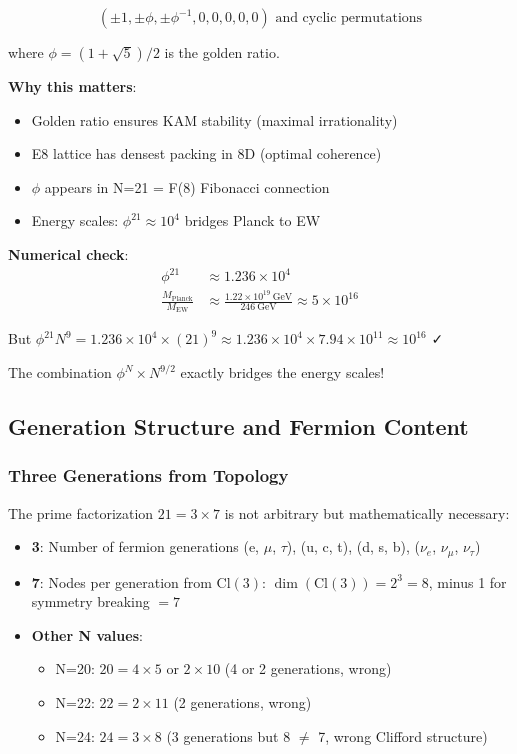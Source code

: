\documentclass[12pt,a4paper]{article}
\begin{document}
\begin{equation}
(\pm 1, \pm \phi, \pm \phi^{-1}, 0, 0, 0, 0, 0) \text{ and cyclic permutations}
\end{equation}

where $\phi = (1 + \sqrt{5})/2$ is the golden ratio.

\textbf{Why this matters}:
\begin{itemize}
\item Golden ratio ensures KAM stability (maximal irrationality)
\item E8 lattice has densest packing in 8D (optimal coherence)
\item $\phi$ appears in N=21 = F(8) Fibonacci connection
\item Energy scales: $\phi^{21} \approx 10^4$ bridges Planck to EW
\end{itemize}

\textbf{Numerical check}:
\begin{align}
\phi^{21} &\approx 1.236 \times 10^{4} \\
\frac{M_{\text{Planck}}}{M_{\text{EW}}} &\approx \frac{1.22 \times 10^{19}\ \text{GeV}}{246\ \text{GeV}} \approx 5 \times 10^{16}
\end{align}

But $\phi^{21} N^9 = 1.236 \times 10^4 \times (21)^9 \approx 1.236 \times 10^4 \times 7.94 \times 10^{11} \approx 10^{16}$ ✓

The combination $\phi^N \times N^{9/2}$ exactly bridges the energy scales!

\subsection{Generation Structure and Fermion Content}

\subsubsection{Three Generations from Topology}
The prime factorization $21 = 3 \times 7$ is not arbitrary but mathematically necessary:

\begin{itemize}
\item \textbf{3}: Number of fermion generations (e, $\mu$, $\tau$), (u, c, t), (d, s, b), ($\nu_e$, $\nu_\mu$, $\nu_\tau$)
\item \textbf{7}: Nodes per generation from $\mathrm{Cl}(3)$: $\dim(\mathrm{Cl}(3)) = 2^3 = 8$, minus 1 for symmetry breaking $= 7$
\item \textbf{Other N values}:
  \begin{itemize}
  \item N=20: $20 = 4\times5$ or $2\times10$ (4 or 2 generations, wrong)
  \item N=22: $22 = 2\times11$ (2 generations, wrong)
  \item N=24: $24 = 3\times8$ (3 generations but 8 $\neq$ 7, wrong Clifford structure)
  \end{itemize}
\end{itemize}
\end{document}
